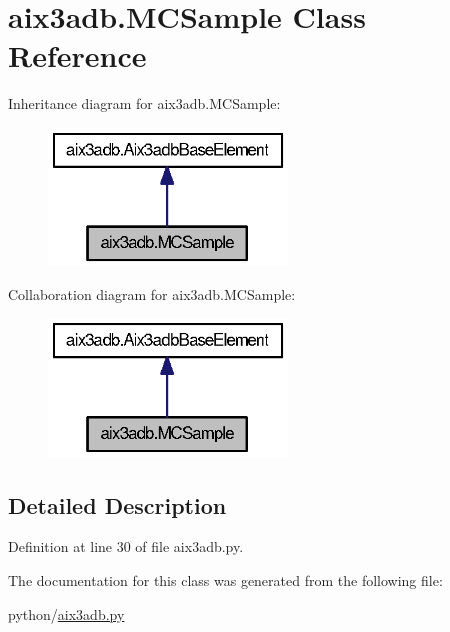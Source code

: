 \section{aix3adb.\-M\-C\-Sample Class Reference}
\label{classaix3adb_1_1MCSample}


Inheritance diagram for aix3adb.\-M\-C\-Sample\-:
\nopagebreak
\begin{figure}[H]
\begin{center}
\leavevmode
\includegraphics[width=180pt]{classaix3adb_1_1MCSample__inherit__graph}
\end{center}
\end{figure}


Collaboration diagram for aix3adb.\-M\-C\-Sample\-:
\nopagebreak
\begin{figure}[H]
\begin{center}
\leavevmode
\includegraphics[width=180pt]{classaix3adb_1_1MCSample__coll__graph}
\end{center}
\end{figure}


\subsection{Detailed Description}


Definition at line 30 of file aix3adb.\-py.



The documentation for this class was generated from the following file\-:\begin{DoxyCompactItemize}
\item 
python/\hyperlink{aix3adb_8py}{aix3adb.\-py}\end{DoxyCompactItemize}

